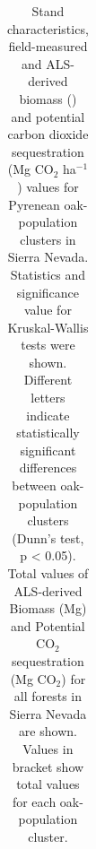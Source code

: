 \begin{table} 
\caption{Stand characteristics, field-measured and ALS-derived biomass (\mgha) and potential carbon dioxide sequestration (Mg CO$_2$ ha$^{-1}$) values for Pyrenean oak-population clusters in Sierra Nevada. Statistics and significance value for Kruskal-Wallis tests were shown. Different letters indicate statistically significant differences between oak-population clusters (Dunn's test, p < 0.05). Total values of ALS-derived Biomass (Mg) and Potential CO$_2$ sequestration (Mg CO$_2$) for all \Qp forests in Sierra Nevada are shown. Values in bracket show total values for each oak-population cluster.}\label{tab:carbon:compara}
\begin{adjustbox}{width=\linewidth}
	\begin{threeparttable}
		\begin{tabular}{lclclclrrr} 


\end{tabular}
\end{threeparttable}
\end{adjustbox}
\end{table}
